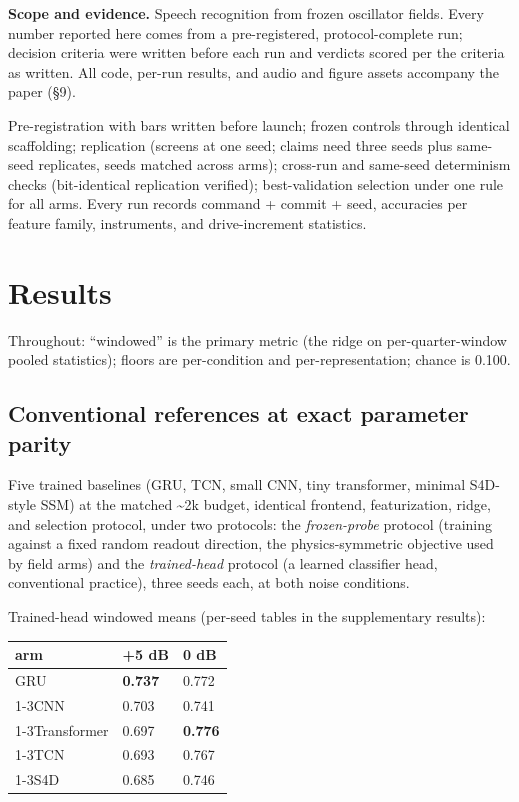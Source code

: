 \documentclass[10pt]{article}
\makeatletter
\newcounter{none} %
\newcommand{\tmlr@floatbarrier}{\par\vspace{\z@}%
  \ifx\@deferlist\@empty\else\clearpage\fi}
\let\tmlr@section\section
\renewcommand{\section}{\tmlr@floatbarrier\tmlr@section}
\makeatother
\begin{document}
\textbf{Scope and evidence.} Speech recognition from frozen oscillator
fields. Every number reported here comes from a pre-registered,
protocol-complete run; decision criteria were written before each run
and verdicts scored per the criteria as written. All code, per-run
results, and audio and figure assets accompany the paper (§9).

Pre-registration with bars written before launch; frozen controls
through identical scaffolding; replication (screens at one seed; claims
need three seeds plus same-seed replicates, seeds matched across arms);
cross-run and same-seed determinism checks (bit-identical replication
verified); best-validation selection under one rule for all arms. Every
run records command + commit + seed, accuracies per feature family,
instruments, and drive-increment statistics.

\section{Results}\label{results}

Throughout: ``windowed'' is the primary metric (the ridge on
per-quarter-window pooled statistics); floors are per-condition and
per-representation; chance is 0.100.

\subsection{Conventional references at exact parameter
parity}\label{conventional-references-at-exact-parameter-parity}

Five trained baselines (GRU, TCN, small CNN, tiny transformer, minimal
S4D-style SSM) at the matched \textasciitilde2k budget, identical
frontend, featurization, ridge, and selection protocol, under two
protocols: the \emph{frozen-probe} protocol (training against a fixed
random readout direction, the physics-symmetric objective used by field
arms) and the \emph{trained-head} protocol (a learned classifier head,
conventional practice), three seeds each, at both noise conditions.

Trained-head windowed means (per-seed tables in the supplementary
results):

{\def\LTcaptype{none} %
\begin{longtable}[]{@{}lll@{}}
\toprule\noalign{}
arm & +5 dB & 0 dB \\
\midrule\noalign{}
\endhead
\bottomrule\noalign{}
\endlastfoot
GRU & \textbf{0.737} & 0.772 \\
\cmidrule{1-3}CNN & 0.703 & 0.741 \\
\cmidrule{1-3}Transformer & 0.697 & \textbf{0.776} \\
\cmidrule{1-3}TCN & 0.693 & 0.767 \\
\cmidrule{1-3}S4D & 0.685 & 0.746 \\
\end{longtable}
}
\end{document}
